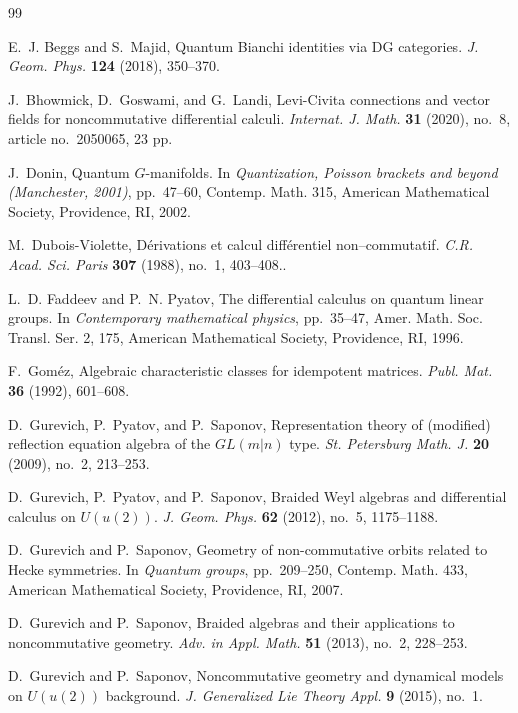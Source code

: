 \documentclass[11pt]{article}
\numberwithin{equation}{section}
\theoremstyle{plain}
\theoremstyle{definition}
\begin{document}
\begin{thebibliography}{99}

E.~J. Beggs and S.~Majid, Quantum Bianchi identities via DG categories.
\emph{J. Geom. Phys.} \textbf{124} (2018), 350--370.

J.~Bhowmick, D.~Goswami, and G.~Landi, Levi-Civita connections and vector fields for noncommutative differential calculi.
\emph{Internat. J. Math.} \textbf{31} (2020), no.~8, article no.~2050065, 23 pp.

J.~Donin, Quantum $G$-manifolds.
In \emph{Quantization, Poisson brackets and beyond (Manchester, 2001)}, pp.~47--60,
Contemp. Math. 315, American Mathematical Society, Providence, RI, 2002.

M.~Dubois-Violette,  D\'erivations et calcul diff\'erentiel non–commutatif.
\emph{C.R. Acad. Sci. Paris } \textbf{307} (1988), no.~1, 403–408..

L.~D. Faddeev and P.~N. Pyatov, The differential calculus on quantum linear groups.
In \emph{Contemporary mathematical physics}, pp.~35--47,
Amer. Math. Soc. Transl. Ser. 2, 175, American Mathematical Society, Providence, RI, 1996.

F.~Gom\'ez, Algebraic characteristic classes for idempotent matrices.
\emph{Publ. Mat.} \textbf{36} (1992), 601--608.

D.~Gurevich, P.~Pyatov, and P.~Saponov, Representation theory of (modified) reflection equation algebra of the $GL(m|n)$ type.
\emph{St. Petersburg Math. J.} \textbf{20} (2009), no.~2, 213--253.

D.~Gurevich, P.~Pyatov, and P.~Saponov, Braided Weyl algebras and differential calculus on $U(u(2))$.
\emph{J. Geom. Phys.} \textbf{62} (2012), no.~5, 1175--1188.

D.~Gurevich and P.~Saponov, Geometry of non-commutative orbits related to Hecke symmetries.
In \emph{Quantum groups}, pp.~209--250, Contemp. Math. 433,
American Mathematical Society, Providence, RI, 2007.

D.~Gurevich and P.~Saponov, Braided algebras and their applications to noncommutative geometry.
\emph{Adv. in Appl. Math.} \textbf{51} (2013), no.~2, 228--253.

D.~Gurevich and P.~Saponov, Noncommutative geometry and dynamical models on $U(u(2))$ background.
\emph{J. Generalized Lie Theory Appl.} \textbf{9} (2015), no.~1.


\end{thebibliography}
\end{document}

